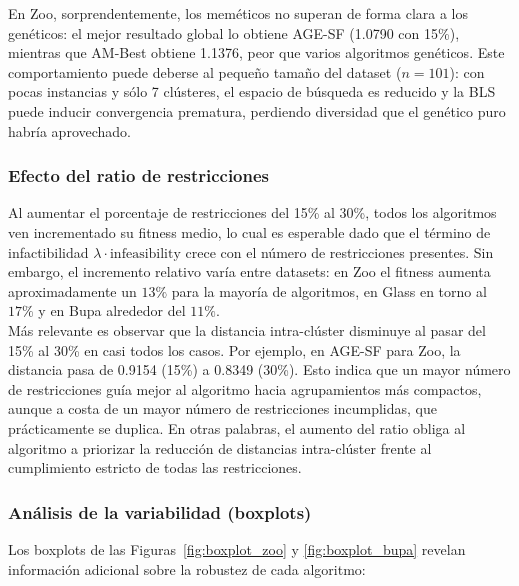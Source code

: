 \documentclass[12pt]{article}
\begin{document}
    En {Zoo}, sorprendentemente, los meméticos no superan de forma clara a los genéticos: el mejor resultado global lo obtiene AGE-SF (1.0790 con 15\%), mientras que AM-Best obtiene 1.1376, peor que varios algoritmos genéticos. Este comportamiento puede deberse al pequeño tamaño del dataset ($n=101$): con pocas instancias y sólo 7 clústeres, el espacio de búsqueda es reducido y la BLS puede inducir convergencia prematura, perdiendo diversidad que el genético puro habría aprovechado.
    
    \subsubsection{Efecto del ratio de restricciones}
    
    Al aumentar el porcentaje de restricciones del 15\% al 30\%, todos los algoritmos ven incrementado su fitness medio, lo cual es esperable dado que el término de infactibilidad $\lambda \cdot \text{infeasibility}$ crece con el número de restricciones presentes. Sin embargo, el incremento relativo varía entre datasets: en {Zoo} el fitness aumenta aproximadamente un $13\%$ para la mayoría de algoritmos, en {Glass} en torno al $17\%$ y en {Bupa} alrededor del $11\%$.\\
    
    Más relevante es observar que la distancia intra-clúster {disminuye} al pasar del 15\% al 30\% en casi todos los casos. Por ejemplo, en AGE-SF para Zoo, la distancia pasa de 0.9154 (15\%) a 0.8349 (30\%). Esto indica que un mayor número de restricciones guía mejor al algoritmo hacia agrupamientos más compactos, aunque a costa de un mayor número de restricciones incumplidas, que prácticamente se duplica. En otras palabras, el aumento del ratio obliga al algoritmo a priorizar la reducción de distancias intra-clúster frente al cumplimiento estricto de todas las restricciones.
    
    \subsubsection{Análisis de la variabilidad (boxplots)}
    
    Los boxplots de las Figuras~\ref{fig:boxplot_zoo} y \ref{fig:boxplot_bupa} revelan información adicional sobre la robustez de cada algoritmo:
    
\end{document}
